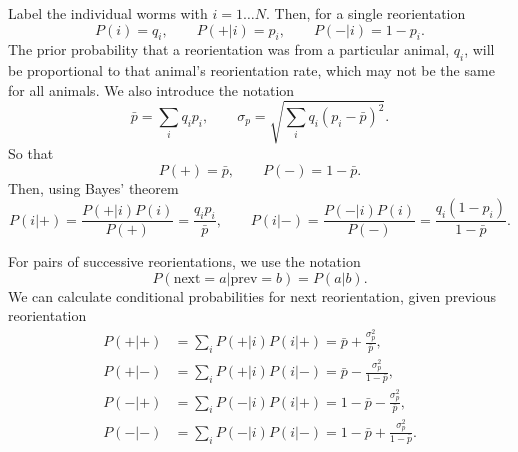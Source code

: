 \documentclass[12pt]{article}
\begin{document}
Label the individual worms with $i=1\ldots N$. Then, for a single reorientation
%
\begin{equation}\label{eq:varisinglereo}
  P(i) = q_i, \qquad
  P(+|i) = p_i, \qquad
  P(-|i) = 1-p_i.
\end{equation}
%
The prior probability that a reorientation was from a particular animal, $q_i$, will be proportional to that animal's reorientation rate, which may not be the same for all animals. We also introduce the notation
%
\begin{equation}\label{eq:varinot}
  \bar{p} = \sum_i q_i p_i, \qquad
  \sigma_p = \sqrt{\sum_i q_i(p_i-\bar{p})^2}.
\end{equation}
%
So that
%
\begin{equation}\label{eq:varimarg}
  P(+) = \bar{p}, \qquad P(-) = 1-\bar{p}.
\end{equation}
%
Then, using Bayes' theorem
%
\begin{equation}\label{eq:singlereobayes}
  P(i|+) = \frac{P(+|i)P(i)}{P(+)} = \frac{q_ip_i}{\bar{p}}, \qquad
  P(i|-) = \frac{P(-|i)P(i)}{P(-)} = \frac{q_i(1-p_i)}{1-\bar{p}}.
\end{equation}
%

For pairs of successive reorientations, we use the notation
%
\begin{equation}\label{eq:varipairnot}
  P(\text{next}=a|\text{prev}=b) = P(a|b)
  .
\end{equation}
%
We can calculate conditional probabilities for next reorientation, given previous reorientation
%
\begin{equation}\label{eq:varicond}
  \begin{aligned}
    P(+|+) &= \sum_i P(+|i)P(i|+) = \bar{p} + \frac{\sigma_p^2}{\bar{p}}, \\
    P(+|-) &= \sum_i P(+|i)P(i|-) = \bar{p} - \frac{\sigma_p^2}{1-\bar{p}}, \\
    P(-|+) &= \sum_i P(-|i)P(i|+) = 1-\bar{p} - \frac{\sigma_p^2}{\bar{p}}, \\
    P(-|-) &= \sum_i P(-|i)P(i|-) =1- \bar{p} + \frac{\sigma_p^2}{1-\bar{p}}.
  \end{aligned}
\end{equation}
%
\end{document}

